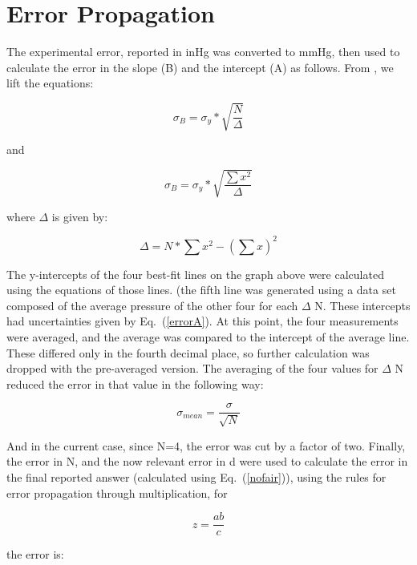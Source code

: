 \documentclass[aps,pre,twocolumn,nofootinbib]{revtex4}
\begin{document}
\appendix*
\section{Error Propagation}
The experimental error, reported in inHg was converted to mmHg, then used to calculate the error in the slope (B) and the intercept (A) as follows.  From \cite{Taylor1997}, we lift the equations: 


\begin{equation}
\label{errorB}
\sigma_B=\sigma_y*\sqrt{\frac{N}{\Delta}}
\end{equation}

and


\begin{equation}
\label{errorA}
\sigma_B=\sigma_y*\sqrt{\frac{\sum x^2}{\Delta}}
\end{equation}

where $\Delta$ is given by:

\begin{equation}
\label{delta}
\Delta=N*\sum x^2-(\sum x)^2
\end{equation}

The y-intercepts of the four best-fit lines on the graph above were calculated using the equations of those lines.  (the fifth line was generated using a data set composed of the average pressure of the other four for each $\Delta$ N.  These intercepts had uncertainties given by Eq.~(\ref{errorA}).  At this point, the four measurements were averaged, and the average was compared to the intercept of the average line.  These differed only in the fourth decimal place, so further calculation was dropped with the pre-averaged version.  The averaging of the four values for $\Delta$ N reduced the error in that value in the following way: 

\begin{equation}
\label{mean}
\sigma_{mean}=\frac{\sigma}{\sqrt{N}}
\end{equation}

And in the current case, since N=4, the error was cut by a factor of two.  Finally, the error in N, and the now relevant error in d were used to calculate the error in the final reported answer (calculated using Eq.~(\ref{nofair})), using the rules for error propagation through multiplication, for

\begin{equation}
\label{multi}
z=\frac{ab}{c}
\end{equation}

the error is:
\end{document}
